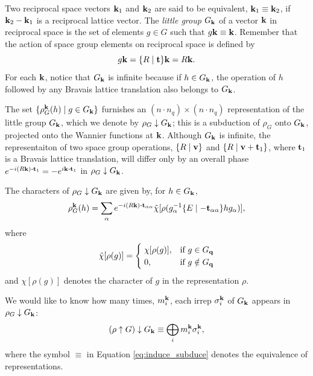 \begin{definition}
Two reciprocal space vectors ${\vb{k}}_1$ and ${\vb{k}}_2$ are said to be equivalent, ${\vb{k}}_1 \equiv {\vb{k}}_2$, if ${\vb{k}}_2 - {\vb{k}}_1$ is a reciprocal lattice vector. The \textit{little group} $G_{\vb{k}}$ of a vector ${\vb{k}}$ in reciprocal space is the set of elements $g \in G$ such that $g {\vb{k}} \equiv {\vb{k}}$. Remember that the action of space group elements on reciprocal space is defined by
$$
g{\vb{k}} = \{ R \mid {\vb{t}} \}{\vb{k}} = R{\vb{k}}.
$$
For each ${\vb{k}}$, notice that $G_{\vb{k}}$ is infinite because if $h \in G_{\vb{k}}$, the operation of $h$ followed by any Bravais lattice translation also belongs to $G_{\vb{k}}$.
\end{definition}

\n

The set $\{\rho_G^{\vb{k}}(h) \mid g \in G_{\vb{k}}\}$ furnishes an $(n\cdot n_q)\times(n\cdot n_q)$ representation of the little group $G_{\vb{k}}$, which we denote by $\rho_G \downarrow G_{\vb{k}}$; this is a subduction of $\rho_G$ onto $G_{\vb{k}}$, projected onto the Wannier functions at ${\vb{k}}$. Although $G_{\vb{k}}$ is infinite, the representaiton of two space group operations, $\{ R \mid {\vb{v}} \}$ and $\{ R \mid {\vb{v}}+{\vb{t}}_1 \}$, where ${\vb{t}}_1$ is a Bravais lattice translation, will differ only by an overall phase $e^{-i(R\k)\vdot\t_1} = -e^{i\k\vdot\t_1}$ in $\rho_G \downarrow G_{\vb{k}}$.

\n

The characters of $\rho_G \downarrow G_{\vb{k}}$ are given by, for $h \in G_{\vb{k}}$,
$$
\rho_G^\k(h) =
\sum_{\alpha} e^{-i(R\k)\vdot\t_{\alpha\alpha}}
\tilde{\chi}[\rho(g_\alpha^{-1}\sg{E}{-\t_{\alpha\alpha}}h g_\alpha)],
$$
where
\begin{align} \label{eq:tilde_chi}
\tilde{\chi}[\rho(g)] =
\begin{cases}
\; \chi[\rho(g)], & \text{if } g \in G_{\vb{q}} \\
\; 0, & \text{if } g \notin G_{\vb{q}}
\end{cases}
\end{align}
and $\chi[\rho(g)]$ denotes the character of $g$ in the representation $\rho$.

\n

We would like to know how many times, $m_i^{\vb{k}}$, each irrep $\sigma_i^{\vb{k}}$ of $G_{\vb{k}}$ appears in $\rho_G \downarrow G_{\vb{k}}$:
\begin{equation} \label{eq:induce_subduce}
(\rho \uparrow G) \downarrow G_{\vb{k}} \equiv \bigoplus_i m_i^{\vb{k}} \sigma_i^{\vb{k}},
\end{equation}
where the symbol $\equiv$ in Equation \ref{eq:induce_subduce} denotes the equivalence of representations.

